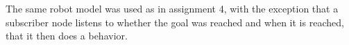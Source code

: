 

The same robot model was used as in assignment 4, with the exception that a subscriber node listens to whether the goal was reached and when it is reached, that it then does a behavior.